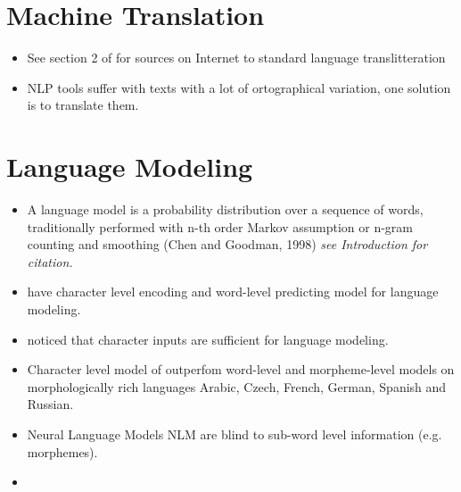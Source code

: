 \documentclass[12pt,a4paper,english
]{tutthesis}
\begin{document}
\section{Machine Translation}
\label{se:machine_translation}
\begin{itemize}
\item See section 2 of \cite{Kestemont2016} for sources on Internet to standard language translitteration
\item NLP tools suffer with texts with a lot of ortographical variation, one solution is to translate them. \cite{Kestemont2016}
\end{itemize}


\section{Language Modeling}
\label{se:language_modeling}
\begin{itemize}
\item A language model is a probability distribution over a sequence of words, traditionally performed with n-th order Markov assumption or n-gram counting and smoothing (Chen and Goodman, 1998) \textit{see \cite{Kim2016} Introduction for citation.}
\item \cite{Kim2016} have character level encoding and word-level predicting model for language modeling.
\item \cite{Kim2016} noticed that character inputs are sufficient for language modeling.
\item Character level model of \cite{Kim2016} outperfom word-level and morpheme-level models on morphologically rich languages Arabic, Czech, French, German, Spanish and Russian.
\item Neural Language Models NLM are blind to sub-word level information (e.g. morphemes). \cite{Kim2016}
\item 
\end{itemize}
\end{document}
